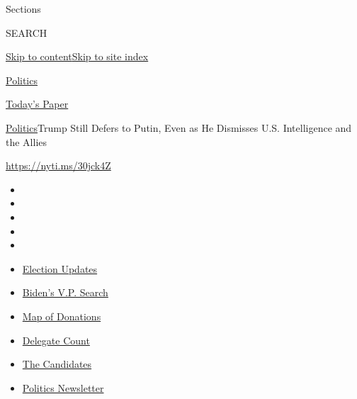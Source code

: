 Sections

SEARCH

\protect\hyperlink{site-content}{Skip to
content}\protect\hyperlink{site-index}{Skip to site index}

\href{https://www.nytimes.com/section/politics}{Politics}

\href{https://myaccount.nytimes.com/auth/login?response_type=cookie\&client_id=vi}{}

\href{https://www.nytimes.com/section/todayspaper}{Today's Paper}

\href{/section/politics}{Politics}\textbar{}Trump Still Defers to Putin,
Even as He Dismisses U.S. Intelligence and the Allies

\url{https://nyti.ms/30jck4Z}

\begin{itemize}
\item
\item
\item
\item
\item
\end{itemize}

\begin{itemize}
\item
  \href{https://www.nytimes.com/2020/07/31/us/elections/biden-vs-trump.html?action=click\&pgtype=Article\&state=default\&region=TOP_BANNER\&context=storylines_menu}{Election
  Updates}
\item
  \href{https://www.nytimes.com/article/biden-vice-president-2020.html?action=click\&pgtype=Article\&state=default\&region=TOP_BANNER\&context=storylines_menu}{Biden's
  V.P. Search}
\item
  \href{https://www.nytimes.com/interactive/2020/07/24/us/politics/trump-biden-campaign-donors.html?action=click\&pgtype=Article\&state=default\&region=TOP_BANNER\&context=storylines_menu}{Map
  of Donations}
\item
  \href{https://www.nytimes.com/interactive/2020/us/elections/delegate-count-primary-results.html?action=click\&pgtype=Article\&state=default\&region=TOP_BANNER\&context=storylines_menu}{Delegate
  Count}
\item
  \href{https://www.nytimes.com/interactive/2019/us/politics/2020-presidential-candidates.html?action=click\&pgtype=Article\&state=default\&region=TOP_BANNER\&context=storylines_menu}{The
  Candidates}
\item
  \href{https://www.nytimes.com/newsletters/politics?action=click\&pgtype=Article\&state=default\&region=TOP_BANNER\&context=storylines_menu}{Politics
  Newsletter}
\end{itemize}

